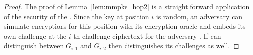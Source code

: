 \begin{proof}
  The proof of Lemma~\ref{lem:mmpke_hop2} is a straight forward application of the \indrcca security of the \dem. Since the
  key at position $i$ is random, an \indrcca adversary can simulate encryptions for this position with its encryption
  oracle and embeds its own challenge at the $i$-th challenge ciphertext for the adversary \Adv. If \Adv can distinguish
  between $G_{i,1}$ and $G_{i,2}$ then \Bdv[2] distinguishes its challenges as well.
\end{proof}







